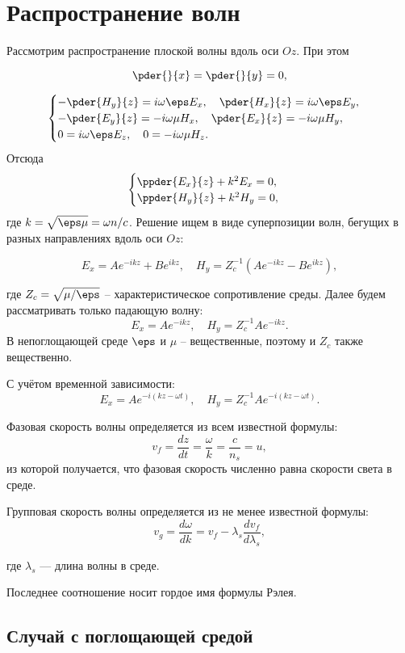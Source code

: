 \chapter{Распространение волн}
Рассмотрим распространение плоской волны вдоль оси \(Oz\). При этом

\[
    \pder{}{x} = \pder{}{y} = 0,
\]

\[
    \begin{cases}
        -\pder{H_y}{z} = i\omega\eps E_x,\quad \pder{H_x}{z} = i\omega\eps E_y,\\
        -\pder{E_y}{z} = -i\omega\mu H_x,\quad \pder{E_x}{z} = -i\omega\mu H_y,\\
        0 = i\omega\eps E_z,\quad 0 = -i\omega\mu H_z.
    \end{cases}
\]
Отсюда
\[
    \begin{cases}
        \ppder{E_x}{z} + k^2 E_x = 0,\\
        \ppder{H_y}{z} + k^2 H_y = 0,\\
    \end{cases}
\]
где \( k = \sqrt{\eps\mu} = \omega n / c \).
Решение ищем в виде суперпозиции волн, бегущих в разных направлениях вдоль оси
\( Oz \):

\[
    E_x = Ae^{-ikz} + Be^{ikz},\quad H_y = Z_c^{-1} (Ae^{-ikz} - Be^{ikz}),
\]

где \( Z_c = \sqrt{\mu / \eps} \) -- характеристическое сопротивление среды.
Далее будем рассматривать только падающую волну:
\[
    E_x = Ae^{-ikz},\quad H_y = Z_c^{-1} Ae^{-ikz}.
\]
В непоглощающей среде \(\eps\) и \(\mu\) -- вещественные, поэтому и \(Z_c\)
также вещественно.

С учётом временной зависимости:
\[
    E_x = Ae^{-i(kz-\omega t)},\quad H_y = Z_c^{-1} Ae^{-i(kz-\omega t)}.
\]

Фазовая скорость волны определяется из всем известной формулы:
\[
v_f=\frac{dz}{dt}=\frac{\omega}{k}=\frac{c}{n_s}=u,
\]
из которой получается, что фазовая скорость численно равна скорости света в среде.

Групповая скорость волны определяется из не менее известной формулы:
\[
v_g=\frac{d\omega}{dk}=v_f - \lambda_s\frac{dv_f}{d\lambda_s},
\]

где $\lambda_s$ --- длина волны в среде.


Последнее соотношение носит гордое имя формулы Рэлея.

\section{Случай с поглощающей средой}

